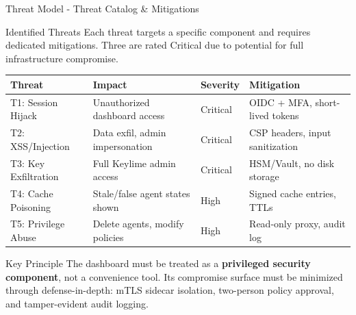 \begin{frame}{Threat Model - Threat Catalog \& Mitigations}
  \begin{block}{Identified Threats}
    \scriptsize
    Each threat targets a specific component and requires dedicated mitigations.
    Three are rated Critical due to potential for full infrastructure compromise.
  \end{block}

  \vspace{0.2cm}

  \scriptsize
  \begin{center}
    \begin{tabular}{|l|p{3.5cm}|l|p{3cm}|}
      \hline
      \textbf{Threat} & \textbf{Impact} & \textbf{Severity} & \textbf{Mitigation} \\
      \hline
      \hline
      T1: Session Hijack & Unauthorized dashboard access & \textcolor{dangered}{Critical} & OIDC + MFA, short-lived tokens \\
      \hline
      T2: XSS/Injection & Data exfil, admin impersonation & \textcolor{dangered}{Critical} & CSP headers, input sanitization \\
      \hline
      T3: Key Exfiltration & Full Keylime admin access & \textcolor{dangered}{Critical} & HSM/Vault, no disk storage \\
      \hline
      T4: Cache Poisoning & Stale/false agent states shown & \textcolor{warningyellow}{High} & Signed cache entries, TTLs \\
      \hline
      T5: Privilege Abuse & Delete agents, modify policies & \textcolor{warningyellow}{High} & Read-only proxy, audit log \\
      \hline
    \end{tabular}
  \end{center}

  \vspace{0.2cm}

  \begin{alertblock}{Key Principle}
    \scriptsize
    The dashboard must be treated as a \textbf{privileged security component}, not a
    convenience tool. Its compromise surface must be minimized through defense-in-depth:
    mTLS sidecar isolation, two-person policy approval, and tamper-evident audit logging.
  \end{alertblock}
\end{frame}


